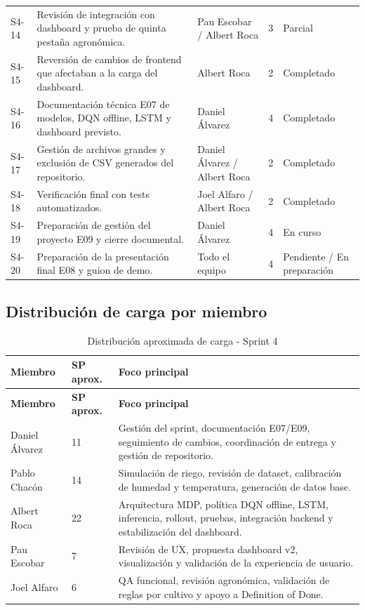 \documentclass[11pt,a4paper]{article}
\begin{document}
\begin{longtable}{p{}p{}p{}p{}p{}}
S4-14 & Revisión de integración con dashboard y prueba de quinta pestaña agronómica. & Pau Escobar / Albert Roca & 3 & Parcial \\
S4-15 & Reversión de cambios de frontend que afectaban a la carga del dashboard. & Albert Roca & 2 & Completado \\
S4-16 & Documentación técnica E07 de modelos, DQN offline, LSTM y dashboard previsto. & Daniel Álvarez & 4 & Completado \\
S4-17 & Gestión de archivos grandes y exclusión de CSV generados del repositorio. & Daniel Álvarez / Albert Roca & 2 & Completado \\
S4-18 & Verificación final con tests automatizados. & Joel Alfaro / Albert Roca & 2 & Completado \\
S4-19 & Preparación de gestión del proyecto E09 y cierre documental. & Daniel Álvarez & 4 & En curso \\
S4-20 & Preparación de la presentación final E08 y guion de demo. & Todo el equipo & 4 & Pendiente / En preparación \\
\bottomrule
\end{longtable}

\subsection{Distribución de carga por miembro}

\begin{longtable}{p{}p{}p{}}
\caption{Distribución aproximada de carga - Sprint 4}\\
\toprule
\textbf{Miembro} & \textbf{SP aprox.} & \textbf{Foco principal} \\
\midrule
\endfirsthead
\toprule
\textbf{Miembro} & \textbf{SP aprox.} & \textbf{Foco principal} \\
\midrule
\endhead
Daniel Álvarez & 11 & Gestión del sprint, documentación E07/E09, seguimiento de cambios, coordinación de entrega y gestión de repositorio. \\
Pablo Chacón & 14 & Simulación de riego, revisión de dataset, calibración de humedad y temperatura, generación de datos base. \\
Albert Roca & 22 & Arquitectura MDP, política DQN offline, LSTM, inferencia, rollout, pruebas, integración backend y estabilización del dashboard. \\
Pau Escobar & 7 & Revisión de UX, propuesta dashboard v2, visualización y validación de la experiencia de usuario. \\
Joel Alfaro & 6 & QA funcional, revisión agronómica, validación de reglas por cultivo y apoyo a Definition of Done. \\
\bottomrule
\end{longtable}
\end{document}
